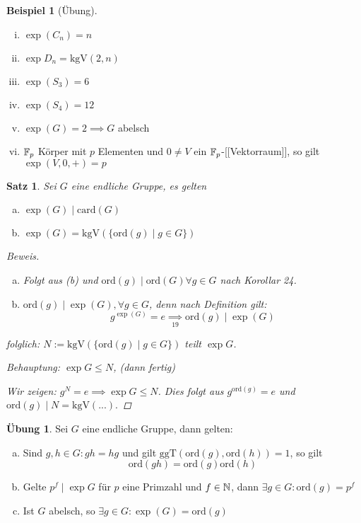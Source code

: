 \documentclass[a4paper]{article}
\theoremstyle{plain}
\newtheorem{satz}[thm]{Satz}
\theoremstyle{definition}
\newtheorem*{bsp*}{Beispiel}
\newtheorem{ubng}[thm]{Übung}
\begin{document}
\begin{bsp*}[Übung] \item
\begin{enumerate}[(i)]
\item $\exp (C_{n}) = n$
\item $\exp D_{n} = \mathrm{kgV}(2,n)$
\item $\exp(S_{3}) = 6$
\item $\exp(S_{4}) = 12$
\item $\exp(G) = 2 \implies G$ abelsch
\item $\Bbb F_{p}$ Körper mit $p$ Elementen und $0 \neq V$ ein $\Bbb F_{p}$-[[Vektorraum]], so gilt $\exp(V, 0, +) = p$
\end{enumerate}
\end{bsp*}

\begin{satz}
  Sei $G$ eine endliche Gruppe, es gelten
  \begin{enumerate}[(a)]
    \item $\exp(G) \mid \mathrm{card}(G)$
    \item $\exp(G) = \mathrm{kgV}(\{\mathrm{ord}(g)\mid g \in G\})$
  \end{enumerate}
\begin{proof}[Beweis] \item
\begin{enumerate}[(a)]
\item Folgt aus (b) und $\mathrm{ord}(g) \mid \mathrm{ord}(G) \forall g \in G$ nach Korollar 24.
\item $\mathrm{ord}(g) \mid \exp(G), \forall g \in G$, denn nach Definition gilt:
$$g^{\exp(G)} = e \underset{19} \implies \mathrm{ord}(g ) \mid \exp(G)$$
\end{enumerate}
folglich: $N:= \mathrm{kgV}(\{\mathrm{ord}(g) \mid g \in G\})$ teilt $\exp G$.

        Behauptung: $\exp G \le N$, (dann fertig)

        Wir zeigen: $g^{N} = e \implies \exp G \le N$.
Dies folgt aus $g^{\mathrm{ord}(g)} = e$ und $\mathrm{ord}(g) \mid N = \mathrm{kgV}(...).$
\end{proof}
\end{satz}

\begin{ubng}%
  Sei $G$ eine endliche Gruppe, dann gelten:
  \begin{enumerate}[(a)]
    \item Sind $g,h \in G : gh = hg$ und gilt $\mathrm{ggT}(\mathrm{ord}(g), \mathrm{ord}(h)) = 1$, so gilt $$\mathrm{ord}(gh) = \mathrm{ord}(g)\mathrm{ord}(h)$$
    \item Gelte $p^{f} \mid \exp G$ für $p$ eine Primzahl und $f \in \Bbb N$, dann $\exists g \in G : \mathrm{ord}(g) = p^{f}$
    \item Ist $G$ abelsch, so $\exists g \in G : \exp (G) = \mathrm{ord}(g)$
  \end{enumerate}
\end{ubng}
\end{document}
